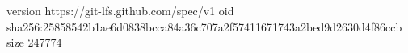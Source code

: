 version https://git-lfs.github.com/spec/v1
oid sha256:25858542b1ae6d0838bcca84a36c707a2f57411671743a2bed9d2630d4f86ccb
size 247774
